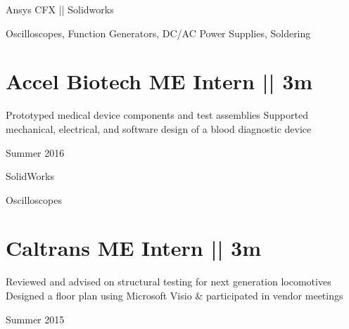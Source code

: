 \vspace{-1.5ex}
{
\vspace{1.8ex}
\color{cyan}\small
{Ansys CFX || Solidworks} %
}

{
\vspace{-2.5ex}\hspace{1.5in}
\color{cyan}\small
{Oscilloscopes, Function Generators, DC/AC Power Supplies, Soldering} %
}

\vspace{0.8ex}
\section
{\textbf{Accel Biotech}
\newline
ME Intern || 3m}

\BulletItem
\vspace{-2.5ex}
\begin{detail}
\BulletItem
Prototyped medical device components and test assemblies
\BulletItem
Supported mechanical, electrical, and software design of a blood diagnostic device
\end{detail}

\begin{subtitle}
\vspace{-7.8ex}
{{Summer 2016}}
\end{subtitle}
\vspace{0ex}

{
\vspace{0.5ex}
\color{cyan}\small
{SolidWorks} %
}

{
\vspace{-2.5ex}\hspace{1.5in}
\color{cyan}\small
{Oscilloscopes} %
}

\vspace{0.8ex}
\section
{\textbf{Caltrans}
\newline
ME Intern || 3m
\newline
}

\BulletItem
\vspace{-2.5ex}
\begin{detail}
\BulletItem
Reviewed and advised on structural testing for next generation locomotives
\BulletItem
Designed a floor plan using {\color{cyan}Microsoft Visio} \& participated in vendor meetings
\end{detail}

\begin{subtitle}
\vspace{-7.8ex}
{{Summer 2015}}
\end{subtitle}

